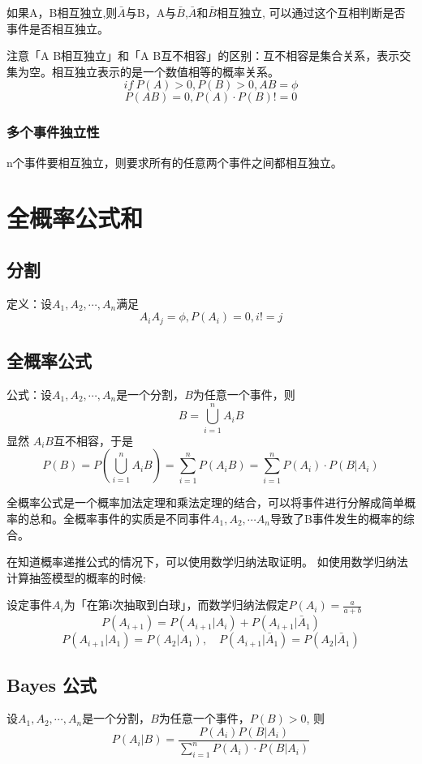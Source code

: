 \documentclass[10pt, a4paper]{article}
\begin{document}
                如果A，B相互独立,则$\bar{A}$与B，A与$\bar{B}$,$\bar{A}$和$\bar{B}$相互独立, 可以通过这个互相判断是否事件是否相互独立。

                注意「A B相互独立」和「A B互不相容」的区别：互不相容是集合关系，表示交集为空。相互独立表示的是一个数值相等的概率关系。
                    $$if\ P(A) > 0, P(B) > 0, AB = \phi$$
                    $$P(AB) = 0, P(A) \cdot P(B) != 0$$ 
                \subsubsection{多个事件独立性}
                    n个事件要相互独立，则要求所有的任意两个事件之间都相互独立。
    \section{全概率公式和}
        \subsection{分割}
            定义：设$A_1, A_2, \cdots, A_n$满足
            $$A_iA_j = \phi, P(A_i) = 0, i !=j $$
            $$$$

        \subsection{全概率公式}
            公式：设$A_1, A_2, \cdots, A_n$是一个分割，$B$为任意一个事件，则
                    $$B = \bigcup_{i = 1}^{n}A_iB$$
            显然 $A_iB$互不相容，于是
            $$P(B) = P(\bigcup_{i = 1}^{n}A_iB) = \sum_{i = 1}^{n}P(A_iB) = \sum_{i = 1}^{n}P(A_i)\cdot P(B|A_i)$$
            
            全概率公式是一个概率加法定理和乘法定理的结合，可以将事件进行分解成简单概率的总和。全概率事件的实质是不同事件$A_1, A_2, \cdots A_n$导致了B事件发生的概率的综合。
            
            在知道概率递推公式的情况下，可以使用数学归纳法取证明。 如使用数学归纳法计算抽签模型的概率的时候: 

            设定事件$A_i$为「在第i次抽取到白球」，而数学归纳法假定$P(A_i) = \frac{a}{a + b}$
            \begin{equation*}
                P(A_{i + 1}) = P(A_{i + 1}|A_i) + P(A_{i + 1}| \bar{A}_1)
            \end{equation*}
            $$P(A_{i + 1} | A_1) = P(A_2 | A_1),\quad P(A_{i + 1}|\bar{A}_1) = P(A_2|\bar{A}_1)$$
        \subsection{Bayes 公式}
            设$A_1, A_2, \cdots, A_n$是一个分割，$B$为任意一个事件，$P(B) > 0$, 则
            $$P(A_i|B) = \frac{P(A_i)P(B|A_i)}{\sum_{i = 1}^{n}P(A_i)\cdot P(B|A_i)}$$
\end{document}
